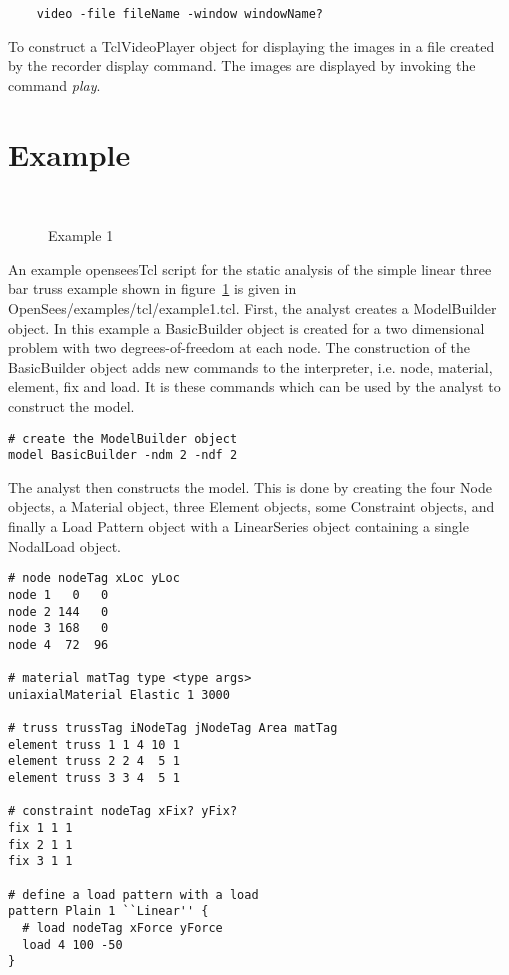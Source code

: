 \documentclass[12pt]{article}
\begin{document}
{\sf\small
\begin{verbatim}
    video -file fileName -window windowName?
\end{verbatim}
}

\noindent To construct a TclVideoPlayer object for displaying the images in a file
created by the recorder display command. The images are displayed by invoking the 
command {\em play}.


\section{Example}

\begin{figure}[htpb]
\begin{center}
\leavevmode
\hbox{%
}
\end{center}
\caption{Example 1}
\label{example1}
\end{figure}

\noindent An example openseesTcl script for the static analysis of the
simple linear three bar truss example shown in figure~\ref{example1} is
given in {\sf OpenSees/examples/tcl/example1.tcl}. First, the analyst creates a
ModelBuilder object. In this example a BasicBuilder object is
created for a two dimensional problem with two degrees-of-freedom at each
node. The construction of the BasicBuilder object adds new
commands to the interpreter, i.e. node, material, element, fix and
load. It is these commands which can be used by the analyst to
construct the model. 

{\sf\small \begin{verbatim}
# create the ModelBuilder object
model BasicBuilder -ndm 2 -ndf 2
\end{verbatim} }

The analyst then constructs the model. This is done by creating
the four Node objects, a Material object, three Element objects, some
Constraint objects, and finally a Load Pattern object with a
LinearSeries object containing a single NodalLoad object. 

{\sf\small \begin{verbatim}
# node nodeTag xLoc yLoc
node 1   0   0 
node 2 144   0 
node 3 168   0
node 4  72  96

# material matTag type <type args>
uniaxialMaterial Elastic 1 3000

# truss trussTag iNodeTag jNodeTag Area matTag
element truss 1 1 4 10 1
element truss 2 2 4  5 1
element truss 3 3 4  5 1

# constraint nodeTag xFix? yFix?
fix 1 1 1
fix 2 1 1
fix 3 1 1

# define a load pattern with a load
pattern Plain 1 ``Linear'' {
  # load nodeTag xForce yForce
  load 4 100 -50
}
\end{verbatim} }
\end{document}

